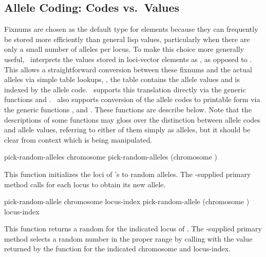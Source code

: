 {\subsection{Allele Coding: Codes vs.\ Values}	\label{allele-coding}

Fixnums are chosen as the default type for  elements because they
can frequently be stored more efficiently than general lisp values, particularly
when there are only a small number of alleles per locus. To make this choice more
generally useful, \geco\ interprets the values stored in loci-vector elements as
, as opposed to . This allows a
straightforward conversion between these fixnums and the actual alleles via simple
table lookups, \ie, the table contains the allele values and is indexed by the
allele code. \Geco\ supports this translation directly via the generic functions
 and . \Geco\ also
supports conversion of the allele codes to printable form via the generic functions
,  and
. These functions are describe below. Note that the
descriptions of some functions may gloss over the distinction between allele codes
and allele values, referring to either of them simply as alleles, but it should be
clear from context which is being manipulated.

\filbreak
{\samepage
\Defgeneric pick-random-alleles {chromosome}
 pick-random-alleles {(chromosome )}

This function initializes the loci of 's  to
random alleles. The \geco-supplied primary method calls  for
each locus to obtain its new allele.
\par}%

\filbreak
{\samepage
\Defgeneric pick-random-allele {chromosome locus-index}
 pick-random-allele {(chromosome ) locus-index}

This function returns a random  for the indicated locus of
. The \geco-supplied primary method selects a random number in the
proper range by calling  with the value returned by the
 function for the indicated chromosome and locus-index.
\par}%

}

